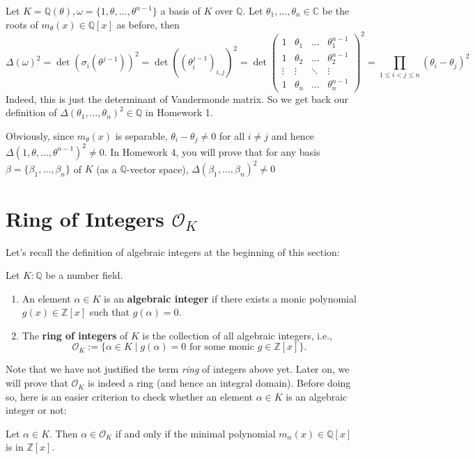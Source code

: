 \begin{example} \label{eg-discrim} Let $K = \mathbb{Q}(\theta), \omega = \{1, \theta, \dots, \theta^{n-1}\}$ a basis of $K$ over $\mathbb{Q}$. Let $\theta_1, \dots, \theta_n \in \mathbb{C}$ be the roots of $m_{\theta}(x) \in \mathbb{Q}[x]$ as before, then
\[
\Delta(\omega)^2 = \det(\sigma_i(\theta^{j-1}))^2 = \det((\theta_i^{j-1})_{i,j})^2
= \det\begin{pmatrix}
1 & \theta_1 & \dots & \theta_1^{n-1} \\
1 & \theta_2 & \dots & \theta_2^{n-1} \\
\vdots & \vdots & \ddots & \vdots \\
1 & \theta_n & \dots & \theta_n^{n-1}
\end{pmatrix}^2 = \prod_{1\leq i<j \leq n} (\theta_i - \theta_j)^2
\]
Indeed, this is just the determinant of Vandermonde matrix. So we get back our definition of $\Delta(\theta_1, \dots, \theta_n)^2 \in \mathbb{Q}$ in Homework 1.
\end{example}
Obviously, since $m_{\theta}(x)$ is separable, $\theta_i - \theta_j \neq 0$ for all $i \neq j$ and hence $\Delta(1,\theta,\dots,\theta^{n-1})^2 \neq 0$. In Homework 4, you will prove that for any basis $\beta = \{\beta_1, \dots, \beta_n\}$ of $K$ (as a $\mathbb{Q}$-vector space), $\Delta(\beta_1, \dots, \beta_n)^2 \neq 0$

\section{Ring of Integers $\mathcal{O}_K$}
Let's recall the definition of algebraic integers at the beginning of this section:
\begin{definition}
Let $ K: \mathbb{Q} $ be a number field. 
\begin{enumerate}
    \item[(a)] An element $ \alpha \in K $ is an {\bf algebraic integer} if there exists a monic polynomial $ g(x) \in \mathbb{Z}[x] $ such that $ g(\alpha) = 0 $.
    \item[(b)] The {\bf ring of integers} of $ K $ is the collection of all algebraic integers, i.e.,
$$
\mathcal{O}_K := \{\alpha \in K \mid g(\alpha) = 0 \text{ for some monic } g \in \mathbb{Z}[x]\}.
$$
\end{enumerate}
\end{definition}

Note that we have not justified the term {\it ring} of integers above yet. Later on, we will prove that $\mathcal{O}_K$ is indeed a ring (and hence an integral domain). Before doing so, here is an easier criterion to check whether an element $\alpha \in K$ is an algebraic integer or not:
\begin{lemma} \label{lem-okminpoly}
Let $\alpha \in K$. Then $ \alpha \in \mathcal{O}_K $ if and only if the minimal polynomial $ m_\alpha(x) \in \mathbb{Q}[x] $ is in $ \mathbb{Z}[x] $.
\end{lemma}

